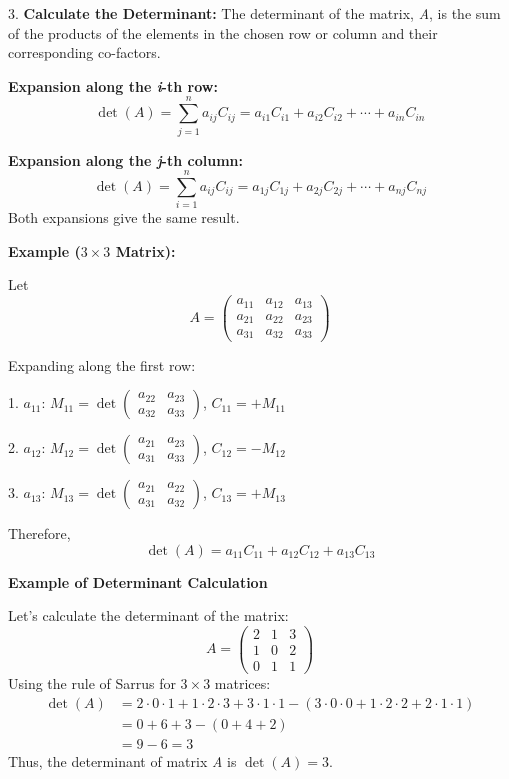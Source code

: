  3.\textbf{ Calculate the Determinant:} The determinant of the matrix, \emph{A}, is the sum of 
 the products of the elements in the chosen row or column and their corresponding co-factors.

    \textbf{Expansion along the \emph{i}-th row:}
        \[
        \det(A) = \sum_{j=1}^{n} a_{ij} C_{ij} = a_{i1}C_{i1} + a_{i2}C_{i2} + \cdots + a_{in}C_{in}
        \]

    \textbf{Expansion along the \emph{j}-th column:}
        \[
        \det(A) = \sum_{i=1}^{n} a_{ij} C_{ij} = a_{1j}C_{1j} + a_{2j}C_{2j} + \cdots + a_{nj}C_{nj}
        \]
        Both expansions give the same result.

\textbf{Example (\(3\times3\) Matrix):}

Let
\[
A = \begin{pmatrix}
a_{11} & a_{12} & a_{13} \\
a_{21} & a_{22} & a_{23} \\
a_{31} & a_{32} & a_{33}
\end{pmatrix}
\]

Expanding along the first row:

1. \(a_{11}\):  \(M_{11} = \det \begin{pmatrix} a_{22} & a_{23} \\ a_{32} & a_{33} \end{pmatrix}\),  \(C_{11} = +M_{11}\)

2. \(a_{12}\):  \(M_{12} = \det \begin{pmatrix} a_{21} & a_{23} \\ a_{31} & a_{33} \end{pmatrix}\),  \(C_{12} = -M_{12}\)

3. \(a_{13}\):  \(M_{13} = \det \begin{pmatrix} a_{21} & a_{22} \\ a_{31} & a_{32} \end{pmatrix}\),  \(C_{13} = +M_{13}\)

Therefore,
\[
\det(A) = a_{11}C_{11} + a_{12}C_{12} + a_{13}C_{13}
\]


\textbf{Example of Determinant Calculation}

Let's calculate the determinant of the matrix:
\begin{equation*}
A =
\begin{pmatrix}
2 & 1 & 3 \\
1 & 0 & 2 \\
0 & 1 & 1
\end{pmatrix}
\end{equation*}
Using the rule of Sarrus for \(3 \times 3\) matrices:
\begin{align*}
\det(A) &= 2 \cdot 0 \cdot 1 + 1 \cdot 2 \cdot 3 + 3 \cdot 1 \cdot 1 - (3 \cdot 0 \cdot 0 + 1 \cdot 2 \cdot 2 + 2 \cdot 1 \cdot 1) \\
&= 0 + 6 + 3 - (0 + 4 + 2) \\
&= 9 - 6 = 3
\end{align*}
 Thus, the determinant of matrix \emph{A} is \(\det(A) = 3\).

